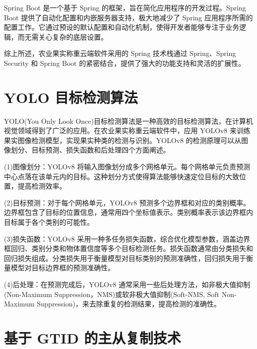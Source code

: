 Spring Boot 是一个基于 Spring 的框架，旨在简化应用程序的开发过程。Spring Boot 提供了自动化配置和内嵌服务器支持，极大地减少了 Spring 应用程序所需的配置工作。它通过预设的默认配置和自动化机制，使得开发者能够专注于业务逻辑，而无需关心复杂的底层设置\cite{Spring-Boot-概述}。

综上所述，农业果实称重云端软件采用的 Spring 技术栈通过 Spring、Spring Security 和 Spring Boot 的紧密结合，提供了强大的功能支持和灵活的扩展性。


\section{YOLO 目标检测算法}\label{sec:yolo}

YOLO(You Only Look Once)目标检测算法是一种高效的目标检测算法，在计算机视觉领域得到了广泛的应用\cite{Lin2019}。在农业果实称重云端软件中，应用 YOLOv8 来训练果实图像检测模型，实现果实种类的检测与识别。YOLOv8 的检测原理可以从图像划分、目标预测、损失函数和后处理四个方面阐述。

(1)图像划分：YOLOv8 将输入图像划分成多个网格单元。每个网格单元负责预测中心点落在该单元内的目标。这种划分方式使得算法能够快速定位目标的大致位置，提高检测效率\cite{Liu2023-yolov8}。

(2)目标预测：对于每个网格单元，YOLOv8 预测多个边界框和对应的类别概率。边界框包含了目标的位置信息，通常用四个坐标值表示。类别概率表示该边界框内目标属于各个类别的可能性\cite{Liu2023-yolov8}。

(3)损失函数：YOLOv8 采用一种多任务损失函数，综合优化模型参数，涵盖边界框回归、类别分类和物体置信度等多个目标检测任务\cite{Liu2023-yolov8}。损失函数通常由分类损失和回归损失组成。分类损失用于衡量模型对目标类别的预测准确性，回归损失用于衡量模型对目标边界框的预测准确性。

(4)后处理：在预测完成后，YOLOv8 通常采用一些后处理方法，如非极大值抑制(Non-Maximum Suppression，NMS)或软非极大值抑制(Soft-NMS, Soft Non-Maximum Suppression)\cite{SuperYOLO8}，来去除重复的检测结果，提高检测的准确性。

\section{基于 GTID 的主从复制技术}\label{sec:gtid}

